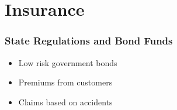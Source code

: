 \section{Insurance}

\begin{frame}
    \frametitle{State Regulations and Bond Funds}
	\begin{itemize}
		\item Low risk government bonds
		\item Premiums from customers
		\item Claims based on accidents
	\end{itemize}
\end{frame}
